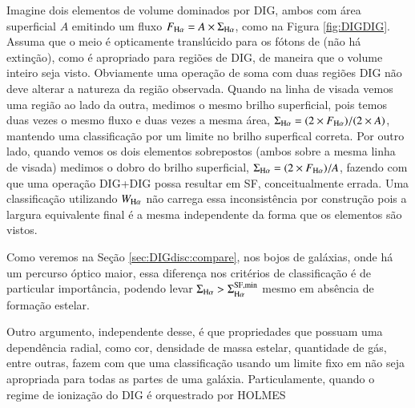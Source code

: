Imagine dois elementos de volume dominados por DIG, ambos com área superficial $A$ emitindo um fluxo $F_{\Ha}=A\times\Sigma_{\Ha}$, como na Figura \ref{fig:DIGDIG}. Assuma que o meio é opticamente translúcido para os fótons de \Ha (não há extinção), como é apropriado para regiões de DIG, de maneira que o volume inteiro seja visto. Obviamente uma operação de soma com duas regiões DIG não deve alterar a natureza da região observada. Quando na linha de visada vemos uma região ao lado da outra, medimos o mesmo brilho superficial, pois temos duas vezes o mesmo fluxo e duas vezes a mesma área, $\Sigma_{\Ha}=(2 \times F_{\Ha})/(2 \times A)$, mantendo uma classificação por um limite no brilho superfical correta. Por outro lado, quando vemos os dois elementos sobrepostos (ambos sobre a mesma linha de visada) medimos o dobro do brilho superficial, $\Sigma_{\Ha}=(2 \times F_{\Ha})/A$, fazendo com que uma operação DIG+DIG possa resultar em SF, conceitualmente errada.
Uma classificação utilizando $W_{\Ha}$ não carrega essa inconsistência por construção pois a largura equivalente final é a mesma independente da forma que os elementos são vistos.

Como veremos na Seção \ref{sec:DIGdisc:compare}, nos bojos de galáxias, onde há um percurso óptico maior, essa diferença nos critérios de classificação é de particular importância, podendo levar $\Sigma_{\Ha} > \Sigma_{\Ha}^{\rm SF,min}$ mesmo em absência de formação estelar.

Outro argumento, independente desse, é que propriedades que possuam uma dependência radial, como cor, densidade de massa estelar, quantidade de gás, entre outras, fazem com que uma classificação usando um limite fixo em não seja apropriada para todas as partes de uma galáxia. Particulamente, quando o regime de ionização do DIG é orquestrado por HOLMES




\label{sec:synvsneb}

